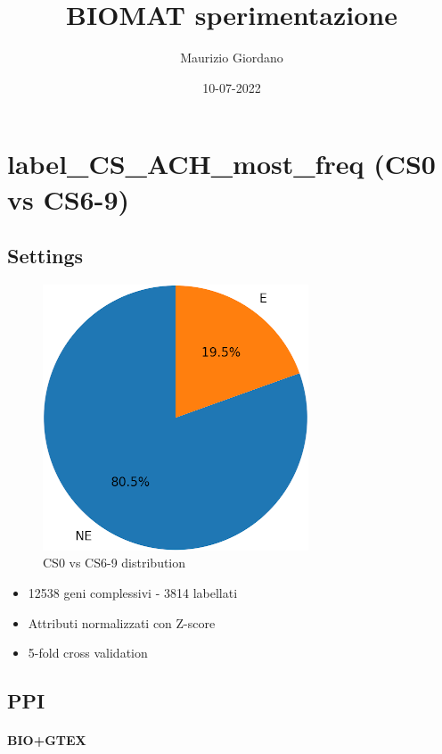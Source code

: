 \documentclass[
]{article}
\title{BIOMAT sperimentazione}
\author{Maurizio Giordano}
\date{10-07-2022}
\providecommand{\tightlist}{%
  \setlength{\itemsep}{0pt}\setlength{\parskip}{0pt}}
\begin{document}
\maketitle

\hypertarget{label_cs_ach_most_freq-cs0-vs-cs6-9}{%
\section{label\_CS\_ACH\_most\_freq (CS0 vs
CS6-9)}\label{label_cs_ach_most_freq-cs0-vs-cs6-9}}

\hypertarget{settings}{%
\subsection{Settings}\label{settings}}

\begin{figure}
\centering
\includegraphics{figures/cs0_69.png}
\caption{CS0 vs CS6-9 distribution}
\end{figure}

\begin{itemize}
\tightlist
\item
  12538 geni complessivi - 3814 labellati
\item
  Attributi normalizzati con Z-score
\item
  5-fold cross validation
\end{itemize}

\hypertarget{ppi}{%
\subsection{PPI}\label{ppi}}

\hypertarget{biogtex}{%
\paragraph{BIO+GTEX}\label{biogtex}}
\end{document}

